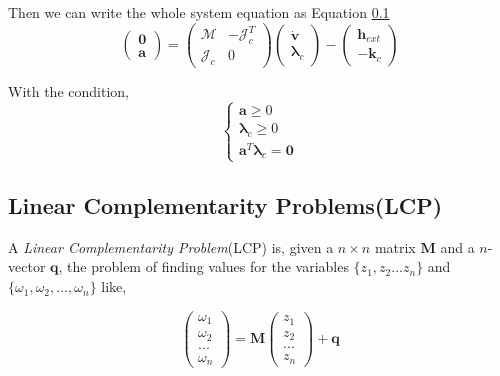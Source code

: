        Then we can write the whole system equation as Equation \ref{}
        \begin{equation}
            \left(\begin{array}{c}\pmb{0} \\ \pmb{a}\end{array}\right)
             = \left(\begin{array}{cc} \mathcal{M} & - \mathcal{J}_{c}^{T} \\ \mathcal{J}_{c} & 0 \end{array}\right)\left(\begin{array}{c}\dot{\mathbf{v}} \\ \pmb{\lambda}_{c}\end{array}\right) - \left(\begin{array}{c}\mathbf{h}_{ext} \\ -\pmb{k}_{c}\end{array}\right)
             \label{sys}
        \end{equation}

        With the condition,
        \begin{equation}
            \begin{cases}
                \pmb{a} \ge 0 \\
                \pmb{\lambda}_{c} \ge 0 \\
                \pmb{a}^{T}\pmb{\lambda}_c = \pmb{0}
            \end{cases}
        \end{equation}

        \subsection{Linear Complementarity Problems(LCP)}
            A \textit{Linear Complementarity Problem}(LCP) is, given a $n \times n$ matrix $\pmb{M}$ and a $n$-vector $\pmb{q}$, the problem of finding values for the variables $\{z_1, z_2 ... z_n\}$ and $\{\omega_1, \omega_2, ... , \omega_n\}$ like,

            \begin{equation}
                \left(\begin{array}{c} \omega_1 \\ \omega_2 \\ ... \\ \omega_n \end{array} \right) = \pmb{M} \left(\begin{array}{c} z_1 \\ z_2 \\ ... \\ z_n \end{array}\right) + \pmb{q}
            \end{equation}

